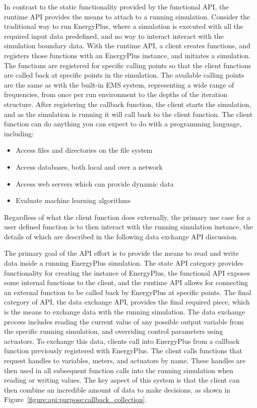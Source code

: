 \documentclass[5p, authoryear]{elsarticle}
\begin{document}
In contrast to the static functionality provided by the functional API, the runtime API provides the means to attach to a running simulation.
Consider the traditional way to run EnergyPlus, where a simulation is executed with all the required input data predefined, and no way to interact interact with the simulation boundary data.
With the runtime API, a client creates functions, and registers those functions with an EnergyPlus instance, and initiates a simulation.
The functions are registered for specific calling points so that the client functions are called back at specific points in the simulation.
The available calling points are the same as with the built-in EMS system, representing a wide range of frequencies, from once per run environment to the depths of the iteration structure.
After registering the callback function, the client starts the simulation, and as the simulation is running it will call back to the client function.
The client function can do anything you can expect to do with a programming language, including:
\begin{itemize}
 \item Access files and directories on the file system
 \item Access databases, both local and over a network
 \item Access web servers which can provide dynamic data
 \item Evaluate machine learning algorithms
\end{itemize}
Regardless of what the client function does externally, the primary use case for a user defined function is to then interact with the running simulation instance, the details of which are described in the following data exchange API discussion.

The primary goal of the API effort is to provide the means to read and write data inside a running EnergyPlus simulation.
The state API category provides functionality for creating the instance of EnergyPlus, the functional API exposes some internal functions to the client, and the runtime API allows for connecting an external function to be called back by EnergyPlus at specific points. 
The final category of API, the data exchange API, provides the final required piece, which is the means to exchange data with the running simulation.
The data exchange process includes reading the current value of any possible output variable from the specific running simulation, and overriding control parameters using actuators.
To exchange this data, clients call into EnergyPlus from a callback function previously registered with EnergyPlus.
The client calls functions that request handles to variables, meters, and actuators by name.
These handles are then used in all subsequent function calls into the running simulation when reading or writing values.
The key aspect of this system is that the client can then combine an incredible amount of data to make decisions, as shown in Figure~\ref{figure:api:purpose:callback_collection}.
\end{document}
